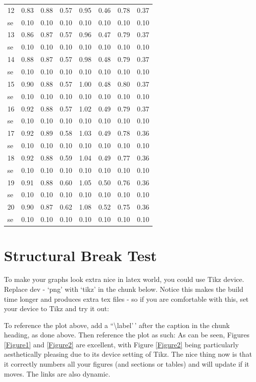 \documentclass[11pt,preprint, authoryear]{elsarticle}
\numberwithin{equation}{section}
\numberwithin{figure}{section}
\numberwithin{table}{section}
\begin{document}
\begin{longtable}{lrrrrrrr}
  12 & 0.83 & 0.88 & 0.57 & 0.95 & 0.46 & 0.78 & 0.37 \\ 
  se & 0.10 & 0.10 & 0.10 & 0.10 & 0.10 & 0.10 & 0.10 \\ 
  13 & 0.86 & 0.87 & 0.57 & 0.96 & 0.47 & 0.79 & 0.37 \\ 
  se & 0.10 & 0.10 & 0.10 & 0.10 & 0.10 & 0.10 & 0.10 \\ 
  14 & 0.88 & 0.87 & 0.57 & 0.98 & 0.48 & 0.79 & 0.37 \\ 
  se & 0.10 & 0.10 & 0.10 & 0.10 & 0.10 & 0.10 & 0.10 \\ 
  15 & 0.90 & 0.88 & 0.57 & 1.00 & 0.48 & 0.80 & 0.37 \\ 
  se & 0.10 & 0.10 & 0.10 & 0.10 & 0.10 & 0.10 & 0.10 \\ 
  16 & 0.92 & 0.88 & 0.57 & 1.02 & 0.49 & 0.79 & 0.37 \\ 
  se & 0.10 & 0.10 & 0.10 & 0.10 & 0.10 & 0.10 & 0.10 \\ 
  17 & 0.92 & 0.89 & 0.58 & 1.03 & 0.49 & 0.78 & 0.36 \\ 
  se & 0.10 & 0.10 & 0.10 & 0.10 & 0.10 & 0.10 & 0.10 \\ 
  18 & 0.92 & 0.88 & 0.59 & 1.04 & 0.49 & 0.77 & 0.36 \\ 
  se & 0.10 & 0.10 & 0.10 & 0.10 & 0.10 & 0.10 & 0.10 \\ 
  19 & 0.91 & 0.88 & 0.60 & 1.05 & 0.50 & 0.76 & 0.36 \\ 
  se & 0.10 & 0.10 & 0.10 & 0.10 & 0.10 & 0.10 & 0.10 \\ 
  20 & 0.90 & 0.87 & 0.62 & 1.08 & 0.52 & 0.75 & 0.36 \\ 
  se & 0.10 & 0.10 & 0.10 & 0.10 & 0.10 & 0.10 & 0.10 \\ 
   \bottomrule
\end{longtable}
\endgroup

\hypertarget{structural-break-test}{%
\section{\texorpdfstring{Structural Break Test
\label{Struc}}{Structural Break Test }}\label{structural-break-test}}

To make your graphs look extra nice in latex world, you could use Tikz
device. Replace dev - `png' with `tikz' in the chunk below. Notice this
makes the build time longer and produces extra tex files - so if you are
comfortable with this, set your device to Tikz and try it out:

To reference the plot above, add a ``\textbackslash label'\,' after the
caption in the chunk heading, as done above. Then reference the plot as
such: As can be seen, Figures \ref{Figure1} and \ref{Figure2} are
excellent, with Figure \ref{Figure2} being particularly aesthetically
pleasing due to its device setting of Tikz. The nice thing now is that
it correctly numbers all your figures (and sections or tables) and will
update if it moves. The links are also dynamic.
\end{document}
